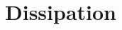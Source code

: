 \documentclass{agujournal}
\begin{document}
{%
%
% 



%
%
%
%
\appendix
   \section{Dissipation}\label{sec:dissipation}
}
\end{document}
